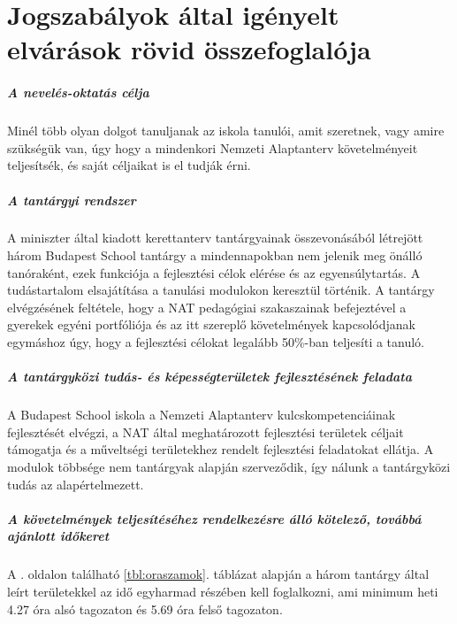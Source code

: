 \chapter{Jogszabályok által igényelt elvárások rövid összefoglalója}
\paragraph{A nevelés-oktatás célja}

Minél több olyan dolgot tanuljanak az iskola tanulói, amit szeretnek, vagy amire szükségük van, úgy hogy a mindenkori Nemzeti Alaptanterv követelményeit teljesítsék, és saját céljaikat is el tudják érni.

\paragraph{A tantárgyi rendszer}

A miniszter által kiadott kerettanterv tantárgyainak összevonásából létrejött három Budapest School tantárgy a mindennapokban nem jelenik meg önálló tanóraként, ezek funkciója a fejlesztési célok elérése és az egyensúlytartás. A tudástartalom elsajátítása a tanulási modulokon keresztül történik. A tantárgy elvégzésének feltétele, hogy a NAT pedagógiai szakaszainak befejeztével a gyerekek egyéni portfóliója és az itt szereplő követelmények kapcsolódjanak egymáshoz úgy, hogy a fejlesztési célokat legalább 50\%-ban teljesíti a tanuló.

\paragraph{A tantárgyközi tudás- és képességterületek fejlesztésének feladata}

A Budapest School iskola a Nemzeti Alaptanterv kulcskompetenciáinak fejlesztését elvégzi, a NAT által meghatározott fejlesztési területek céljait támogatja és a műveltségi területekhez rendelt fejlesztési feladatokat ellátja. A modulok többsége nem tantárgyak alapján szerveződik, így nálunk a tantárgyközi tudás az alapértelmezett.

\paragraph{A követelmények teljesítéséhez rendelkezésre álló kötelező, továbbá ajánlott időkeret}

A \pageref{tbl:oraszamok}. oldalon található \ref{tbl:oraszamok}. táblázat alapján a három tantárgy által leírt területekkel az idő egyharmad részében kell foglalkozni, ami minimum heti 4.27 óra alsó tagozaton és 5.69 óra felső tagozaton.

